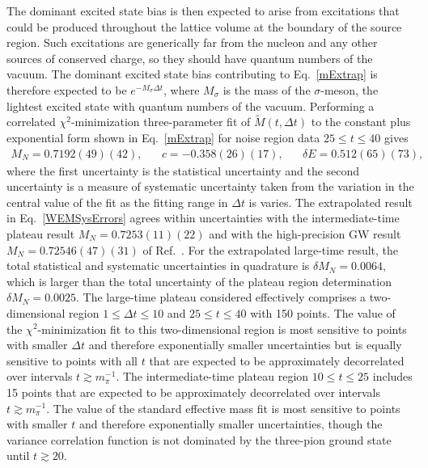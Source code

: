 The dominant excited state bias is then expected to arise from excitations that could be produced throughout the lattice volume at the boundary of the source region.
Such excitations are generically far from the nucleon and any other sources of conserved charge, so they should have quantum numbers of the vacuum.
The dominant excited state bias contributing to Eq.~\eqref{mExtrap} is therefore expected to be $e^{-M_\sigma \Delta t}$, where $M_\sigma$ is the mass of the $\sigma$-meson, the lightest excited state with quantum numbers of the vacuum.
Performing a correlated $\chi^2$-minimization three-parameter fit of $\tilde{M}(t, \Delta t)$ to the constant plus exponential form shown in Eq.~\eqref{mExtrap} for noise region data $25 \leq t \leq 40$ gives
\begin{equation}
  \begin{split}
    M_N = 0.7192(49)(42), \hspace{20pt} c = -0.358(26)(17), \hspace{20pt} \delta E = 0.512(65)(73),
  \end{split}\label{mExtrapResults}
\end{equation}
where the first uncertainty is the statistical uncertainty and the second uncertainty is a measure of systematic uncertainty taken from the variation in the central value of the fit as the fitting range in $\Delta t$ is varies. 
The extrapolated result in Eq.~\ref{WEMSysErrors} agrees within uncertainties with the intermediate-time plateau result $M_N = 0.7253(11)(22)$ and with the high-precision GW result $M_N = 0.72546(47)(31)$ of Ref.~\cite{Orginos:2015aya}.
  For the extrapolated large-time result, the total statistical and systematic uncertainties in quadrature is $\delta M_N = 0.0064$, which is larger than the total uncertainty of the plateau region determination $\delta M_N = 0.0025$.
  The large-time plateau considered effectively comprises a two-dimensional region $1 \leq \Delta t \leq 10$ and $25 \leq t \leq 40$ with 150 points.
  The value of the $\chi^2$-minimization fit to this two-dimensional region is most sensitive to points with smaller $\Delta t$ and therefore exponentially smaller uncertainties but is equally sensitive to points with all $t$ that are expected to be approximately decorrelated over intervals $t \gtrsim m_\pi^{-1}$.
  The intermediate-time plateau region $10 \leq t \leq 25$ includes 15 points that are expected to be approximately decorrelated over intervals $t \gtrsim m_\pi^{-1}$.
  The value of the standard effective mass fit is most sensitive to points with smaller $t$ and therefore exponentially smaller uncertainties, though the variance correlation function is not dominated by the three-pion ground state until $t \gtrsim 20$.
